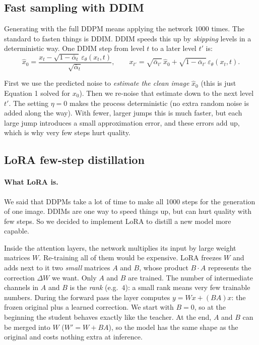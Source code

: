 \documentclass[11pt]{article}
\begin{document}
\subsection{Fast sampling with DDIM}
Generating with the full DDPM means applying the network $1000$ times. The standard to fasten things is DDIM. DDIM speeds this up
by \emph{skipping} levels in a deterministic way. One DDIM step from level $t$ to a later
level $t'$ is:
\begin{equation}
  \hat{x}_0 = \frac{x_t - \sqrt{1-\bar{\alpha}_t}\,\varepsilon_\theta(x_t,t)}
                   {\sqrt{\bar{\alpha}_t}},
  \qquad
  x_{t'} = \sqrt{\bar{\alpha}_{t'}}\,\hat{x}_0
           + \sqrt{1-\bar{\alpha}_{t'}}\,\varepsilon_\theta(x_t,t).
  \label{eq:ddim}
\end{equation}

\noindent First we use the predicted noise to \emph{estimate the clean
image} $\hat{x}_0$ (this is just Equation 1 solved for $x_0$). Then we re-noise
that estimate down to the next level $t'$. The setting $\eta=0$ makes the process
deterministic (no extra random noise is added along the way). With fewer, larger jumps
this is much faster, but each large jump introduces a small approximation error, and
these errors add up, which is why very few steps hurt quality.

\subsection{LoRA few-step distillation}
\paragraph{What LoRA is.} We said that DDPMs take a lot of time to make all 1000 steps for the generation of one image. DDIMs are one way to speed things up, but can hurt quality with few steps. So we decided to implement LoRA to distill a new model more capable.

Inside the attention layers, the network multiplies its input by
large weight matrices $W$. Re-training all of them would be expensive. LoRA freezes $W$ and
adds next to it two \emph{small} matrices $A$ and $B$, whose product $B\!\cdot\!A$ represents
the correction $\Delta W$ we want. Only $A$ and $B$ are trained. The number of intermediate
channels in $A$ and $B$ is the \emph{rank} (e.g.\ $4$): a small rank means very few trainable
numbers. During the forward pass the layer computes $y = Wx + (B A)x$: the frozen original
plus a learned correction. We start with $B=0$, so at the beginning the student behaves
exactly like the teacher. At the end, $A$ and $B$ can be merged into $W$
($W' = W + BA$), so the model has the same shape as the original and costs nothing extra at
inference.
\end{document}
